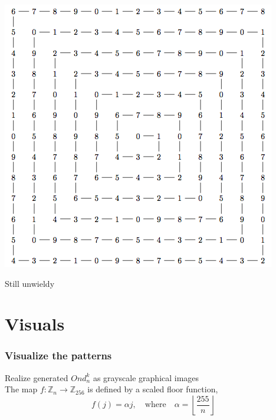 \documentclass{beamer}
\theoremstyle{mydef}
\begin{document}
\frame
{
\begin{center}
\includegraphics[scale=.5]{images/tikz.png}

Still unwieldy

\end{center}
}

\section{Visuals}
\frame
{
  \frametitle{Visualize the patterns}
  Realize generated $Ond_n^k$ as grayscale graphical images\\
  \vspace{10 mm}
  The map $f : \mathbb{Z}_n \to \mathbb{Z}_{256}$ is defined by a scaled floor function,
\[
   f(j) = \alpha j, \quad \text{where} \quad
   \alpha = \left\lfloor \frac{255}n \right\rfloor
\]
}
\end{document}
